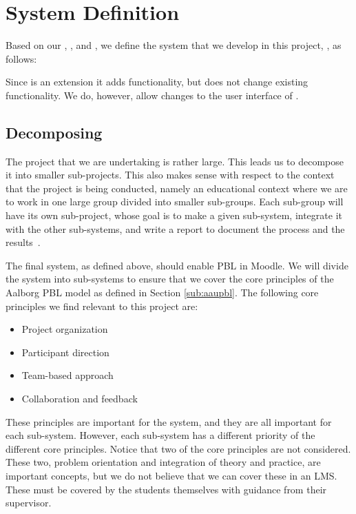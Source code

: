 \chapter{System Definition}
\label{sec:systemDef}
\label{chap:systemDef}
Based on our , , and , we define the system that we develop in this project, \system{}, as follows:


Since \system{} is an extension it adds functionality, but does not change existing functionality.
We do, however, allow changes to the user interface of \moodle{}.


\section{Decomposing \system}
\label{sub:decomposingSys}
The project that we are undertaking is rather large.
This leads us to decompose it into smaller sub-projects.
This also makes sense with respect to the context that the project is being conducted, namely an educational context where we are to work in one large group divided into smaller sub-groups. 
Each sub-group will have its own sub-project, whose goal is to make a given sub-system, integrate it with the other sub-systems, and write a report to document the process and the results~\cite{sw6studieordning}.

The final system, as defined above, should enable PBL in Moodle.
We will divide the system into sub-systems to ensure that we cover the core principles of the Aalborg PBL model as defined in Section \ref{sub:aaupbl}.
The following core principles we find relevant to this project are:

\begin{itemize}
	\item Project organization
  \item Participant direction
  \item Team-based approach
  \item Collaboration and feedback
\end{itemize}

These principles are important for the system, and they are all important for each sub-system.
However, each sub-system has a different priority of the different core principles.
Notice that two of the core principles are not considered.
These two, problem orientation and integration of theory and practice, are important concepts, but we do not believe that we can cover these in an LMS.
These must be covered by the students themselves with guidance from their supervisor.

